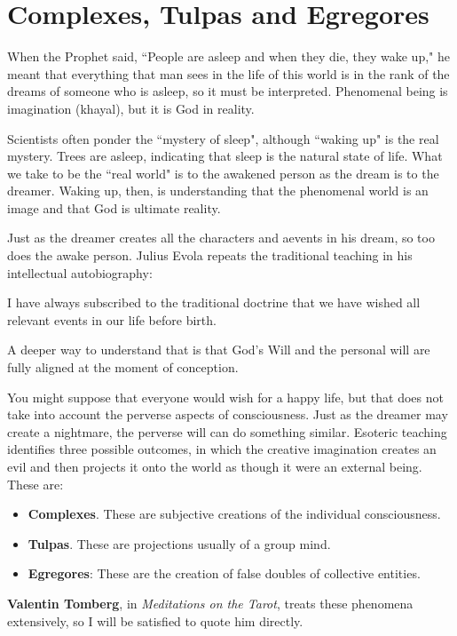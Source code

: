 \section{Complexes, Tulpas and Egregores}

\begin{quotex}
When the Prophet said, ``People are asleep and when they die, they wake up," he meant that everything that man sees in the life of this world is in the rank of the dreams of someone who is asleep, so it must be interpreted. Phenomenal being is imagination (khayal), but it is God in reality. 

\end{quotex}
Scientists often ponder the ``mystery of sleep", although ``waking up" is the real mystery. Trees are asleep, indicating that sleep is the natural state of life. What we take to be the ``real world" is to the awakened person as the dream is to the dreamer. Waking up, then, is understanding that the phenomenal world is an image and that God is ultimate reality.

Just as the dreamer creates all the characters and aevents in his dream, so too does the awake person. Julius Evola repeats the traditional teaching in his intellectual autobiography:

\begin{quotex}
I have always subscribed to the traditional doctrine that we have wished all relevant events in our life before birth. 

\end{quotex}
A deeper way to understand that is that God's Will and the personal will are fully aligned at the moment of conception.

You might suppose that everyone would wish for a happy life, but that does not take into account the perverse aspects of consciousness. Just as the dreamer may create a nightmare, the perverse will can do something similar. Esoteric teaching identifies three possible outcomes, in which the creative imagination creates an evil and then projects it onto the world as though it were an external being. These are:

\begin{itemize}
\item \textbf{Complexes}. These are subjective creations of the individual consciousness. 
\item \textbf{Tulpas}. These are projections usually of a group mind. 
\item \textbf{Egregores}: These are the creation of false doubles of collective entities. 
\end{itemize}
\textbf{Valentin Tomberg}, in \emph{Meditations on the Tarot}, treats these phenomena extensively, so I will be satisfied to quote him directly.

